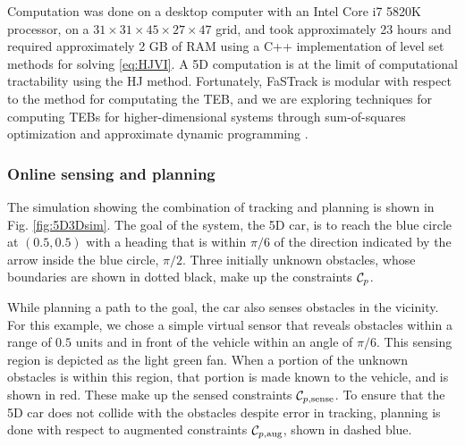 Computation was done on a desktop computer with an Intel Core i7 5820K processor, on a $31\times31\times45\times27\times47$ grid, and took approximately 23 hours and required approximately 2 GB of RAM using a C++ implementation of level set methods for solving \eqref{eq:HJVI}. 
A 5D computation is at the limit of computational tractability using the HJ method.
Fortunately, FaSTrack is modular with respect to the method for computating the TEB, and we are exploring techniques for computing TEBs for higher-dimensional systems through sum-of-squares optimization \cite{SinghChenEtAl2018} and approximate dynamic programming \cite{royo2018classification}.




\subsubsection{Online sensing and planning}
The simulation showing the combination of tracking and planning is shown in Fig. \ref{fig:5D3Dsim}.
The goal of the system, the 5D car, is to reach the blue circle at $(0.5, 0.5)$ with a heading that is within $\pi/6$ of the direction indicated by the arrow inside the blue circle, $\pi/2$.
Three initially unknown obstacles, whose boundaries are shown in dotted black, make up the constraints $\mathcal C_p$.

While planning a path to the goal, the car also senses obstacles in the vicinity.
For this example, we chose a simple virtual sensor that reveals obstacles within a range of $0.5$ units and in front of the vehicle within an angle of $\pi/6$.
This sensing region is depicted as the light green fan.
When a portion of the unknown obstacles is within this region, that portion is made known to the vehicle, and is shown in red.
These make up the sensed constraints $\mathcal C_{p,\text{sense}}$.
To ensure that the 5D car does not collide with the obstacles despite error in tracking, planning is done with respect to augmented constraints $\mathcal C_{p,\text{aug}}$, shown in dashed blue.

